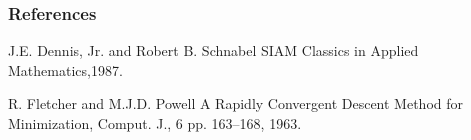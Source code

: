 \documentclass[mathserif,notes]{beamer}
\begin{document}
\begin{frame}[allowframebreaks]
  \frametitle<presentation>{References}    
  \begin{thebibliography}{10}    

 \beamertemplatebookbibitems
 J.E. Dennis, Jr. and Robert B. Schnabel
   \newblock SIAM Classics in Applied Mathematics,1987.

 \beamertemplatearticlebibitems
R. Fletcher and M.J.D. Powell
  \newblock A Rapidly Convergent  Descent Method for Minimization,
 \newblock Comput. J., 6 pp. 163--168, 1963.

 \end{thebibliography}
 \end{frame}
\end{document}
